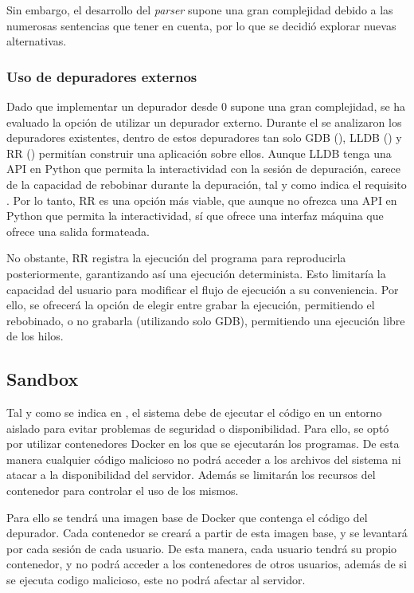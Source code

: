 Sin embargo, el desarrollo del \textit{\gls{parser}} supone una gran complejidad debido a las numerosas sentencias que tener en cuenta, por lo que se decidió explorar nuevas alternativas.

\subsubsection{Uso de depuradores externos} \label{subsec:depuradores-externos}

Dado que implementar un depurador desde 0 supone una gran complejidad, se ha evaluado la opción de utilizar un depurador externo. Durante el  se analizaron los depuradores existentes, dentro de estos depuradores tan solo GDB (), LLDB () y RR () permitían construir una aplicación sobre ellos. Aunque LLDB tenga una API en Python que permita la interactividad con la sesión de depuración, carece de la capacidad de rebobinar durante la depuración, tal y como indica el requisito . Por lo tanto, RR es una opción más viable, que aunque no ofrezca una API en Python que permita la interactividad, sí que ofrece una interfaz máquina que ofrece una salida formateada.

No obstante, RR registra la ejecución del programa para reproducirla posteriormente, garantizando así una ejecución determinista. Esto limitaría la capacidad del usuario para modificar el flujo de ejecución a su conveniencia. Por ello, se ofrecerá la opción de elegir entre grabar la ejecución, permitiendo el rebobinado, o no grabarla (utilizando solo GDB), permitiendo una ejecución libre de los hilos.

\subsection{Sandbox} \label{subsec:sandbox}

Tal y como se indica en , el sistema debe de ejecutar el código en un entorno aislado para evitar problemas de seguridad o disponibilidad. Para ello, se optó por utilizar contenedores Docker en los que se ejecutarán los programas. De esta manera cualquier código malicioso no podrá acceder a los archivos del sistema ni atacar a la disponibilidad del servidor. Además se limitarán los recursos del contenedor para controlar el uso de los mismos.

Para ello se tendrá una imagen base de Docker que contenga el código del depurador. Cada contenedor se creará a partir de esta imagen base, y se levantará por cada sesión de cada usuario. De esta manera, cada usuario tendrá su propio contenedor, y no podrá acceder a los contenedores de otros usuarios, además de si se ejecuta codigo malicioso, este no podrá afectar al servidor. 


